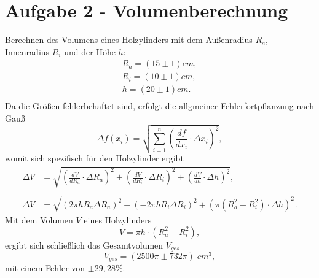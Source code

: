\section*{Aufgabe 2 - Volumenberechnung}
    Berechnen des Volumens eines Holzylinders mit dem Außenradius $R_a$, Innenradius $R_i$ und
    der Höhe $h$:
    \begin{align*}
        R_{a}=(15 \pm 1) \si{cm},\\
        R_{i}=(10 \pm 1) \si{cm},\\
        h=(20 \pm 1) \si{cm}.\\
    \end{align*}
    Da die Größen fehlerbehaftet sind, erfolgt die allgmeiner Fehlerfortpflanzung nach Gauß
    \begin{equation*}
        \Delta f(x_i)=\sqrt{\sum_{i=1}^n \left(\frac{df}{dx_i}\cdot \Delta x_i \right) ^2},
    \end{equation*}
    womit sich spezifisch für den Holzylinder ergibt
    \begin{align*}
        \Delta V &= \sqrt{\left(\frac{dV}{dR_{a}}\cdot \Delta R_{a}\right)^2 + \left(\frac{dV}{dR_{i}}\cdot \Delta R_{i}\right)^2 + \left(\frac{dV}{dh}\cdot \Delta h\right)^2},\\\\
        \Delta V &= \sqrt{(2 \pi h R_a \Delta R_a)^2 + (-2 \pi h R_i \Delta R_i)^2 + (\pi (R_a^2-R_i^2) \cdot \Delta h)^2} .
    \end{align*}
    Mit dem Volumen $V$ eines Holzylinders
    \begin{equation*}
        V= \pi h \cdot(R_{a}^2-R_{i}^2),
    \end{equation*}
    ergibt sich schließlich das Gesamtvolumen $V_{ges}$
    \begin{equation*}
        V_{ges}=(2500\pi \pm 732\pi)\; \si{cm^3},
    \end{equation*}
    mit einem  Fehler von $\pm 29,28$\%.
